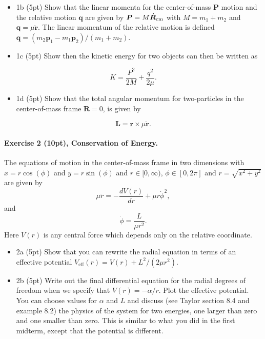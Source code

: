\documentclass[%
oneside,                 %
final,                   %
10pt]{article}
\begin{document}
\begin{itemize}
\item 1b (5pt) Show that the linear momenta for the center-of-mass $\bm{P}$ motion and the relative motion $\bm{q}$ are given by $\bm{P}=M\dot{\bm{R}}_{\rm cm}$ with $M=m_1+m_2$ and $\bm{q}=\mu\dot{\bm{r}}$.  The linear momentum of the relative motion is defined $\bm{q} = (m_2\bm{p}_1-m_1\bm{p}_2)/(m_1+m_2)$.

\item 1c (5pt) Show then the kinetic energy for two objects can then be written as
\end{itemize}

\noindent
\[
K=\frac{P^2}{2M}+\frac{q^2}{2\mu}.
\]

\begin{itemize}
\item 1d (5pt) Show that the total angular momentum for two-particles in the center-of-mass frame $\bm{R}=0$, is given by
\end{itemize}

\noindent
\[
\bm{L}=\bm{r}\times \mu\dot{\bm{r}}.
\]

\paragraph{Exercise 2 (10pt), Conservation of Energy.}
The equations of motion in the center-of-mass frame in two dimensions with $x=r\cos{(\phi)}$ and $y=r\sin{(\phi)}$ and
$r\in [0,\infty)$, $\phi\in [0,2\pi]$ and $r=\sqrt{x^2+y^2}$ are given by
\[
\mu \ddot{r}=-\frac{dV(r)}{dr}+\mu r\dot{\phi}^2,
\]
and
\[
\dot{\phi}=\frac{L}{\mu r^2}.
\]
Here $V(r)$ is any central force which depends only on the relative coordinate.
\begin{itemize}
\item 2a (5pt) Show that you can rewrite the radial equation in terms of an effective potential $V_{\mathrm{eff}}(r)=V(r)+L^2/(2\mu r^2)$. 

\item 2b (5pt) Write out the final differential equation for the radial degrees of freedom when we specify that $V(r)=-\alpha/r$.  Plot the effective potential. You can choose values for $\alpha$ and $L$ and discuss (see Taylor section 8.4 and example 8.2) the physics of the system for two energies, one larger than zero and one smaller than zero. This is similar to what you did in the first midterm, except that the potential is different.
\end{itemize}
\end{document}
